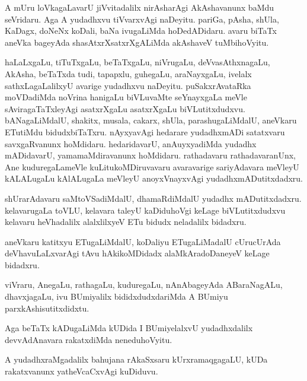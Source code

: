 \documentclass{article}
\begin{document}
\begin{mng}%
A mUru loVkagaLavarU jiVvitadalilx nirAsharAgi AkAshavanunx baMdu seVridaru. Aga A yudadhxvu 
tiVvarxvAgi naDeyitu. pariGa, pAsha, shUla, KaDagx, doNeNx koDali, baNa ivugaLiMda hoDedADidaru. 
avaru biTaTx aneVka bageyAda shasAtxrXsatxrXgALiMda akAshaveV tuMbihoVyitu.
\end{mng}

\begin{mng}%
haLaLxgaLu, tiTuTxgaLu, beTaTxgaLu, niVrugaLu, deVvasAthxnagaLu, AkAsha, beTaTxda tudi, tapapxlu, 
guhegaLu, araNayxgaLu, ivelalx sathxLagaLalilxyU avarige yudadhxvu naDeyitu. puSakxrAvataRka 
moVDadiMda noVrina hanigaLu biVLuvaMte seYnayxgaLa meVle sAviragaTaTxleyAgi asatxrXgaLu 
asatxrXgaLu biVLutitxdudxvu. bANagaLiMdalU, shakitx, musala, cakarx, shUla, parashugaLiMdalU, 
aneVkaru ETutiMdu bidudxbiTaTxru. nAyxyavAgi hedarare yudadhxmADi satatxvaru savxgaRvanunx 
hoMdidaru. hedaridavarU, anAuyxyadiMda yudadhx mADidavarU, yamamaMdiravanunx hoMdidaru. 
rathadavaru rathadavaranUnx, Ane kuduregaLameVle kuLitukoMDiruvavaru avaravarige sariyAdavara 
meVleyU kALALugaLu kAlALugaLa meVleyU anoyxVnayxvAgi yudadhxmADutitxdadxru.
\end{mng}

\begin{mng}%
shUrarAdavaru saMtoVSadiMdalU, dhamaRdiMdalU yudadhx mADutitxdadxru. kelavarugaLa toVLU, kelavara 
taleyU kaDiduhoVgi keLage biVLutitxdudxvu kelavaru heVhadalilx alalxlilxyeV ETu bidudx neladalilx 
bidadxru.
\end{mng}

\begin{mng}%
aneVkaru katitxyu ETugaLiMdalU, koDaliyu ETugaLiMadalU cUrucUrAda deVhavuLaLxvarAgi tAvu 
hAkikoMDidadx alaMkAradoDaneyeV keLage bidadxru.
\end{mng}

\begin{mng}%
viVraru, AnegaLu, rathagaLu, kuduregaLu, nAnAbageyAda ABaraNagALu, dhavxjagaLu, ivu BUmiyalilx 
bididxdudxdariMda A BUmiyu parxkAshisutitxdidxtu.
\end{mng}

\begin{mng}%
Aga beTaTx kADugaLiMda kUDida I BUmiyelalxvU yudadhxdalilx devvAdAnavara rakatxdiMda neneduhoVyitu.
\end{mng}

\begin{mng}%
A yudadhxraMgadalilx bahujana rAkaSxsaru kUrxramaqgagaLU, kUDa rakatxvanunx yatheVcaCxvAgi kuDiduvu.
\end{mng}
\end{document}
